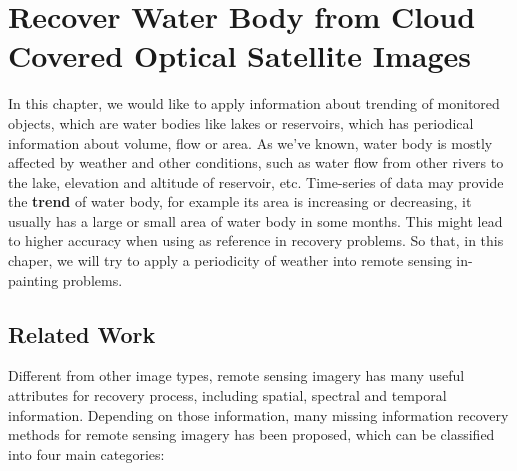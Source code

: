 \chapter{Recover Water Body from Cloud Covered Optical Satellite Images}
\label{chap-3-recover-water-body}
\begin{ChapAbstract}

In this chapter, we would like to apply information about trending of monitored objects, which are water bodies like lakes or reservoirs, which has periodical information about volume, flow or area. As we've known, water body is mostly affected by weather and other conditions, such as water flow from other rivers to the lake, elevation and altitude of reservoir, etc. Time-series of data may provide the \textbf{trend} of water body, for example its area is increasing or decreasing, it usually has a large or small area of water body in some months. This might lead to higher accuracy when using as reference in recovery problems. So that, in this chaper, we will try to apply a periodicity of weather into remote sensing in-painting problems.

\end{ChapAbstract}

\section{Related Work}

Different from other image types, remote sensing imagery has many useful attributes for recovery process, including spatial, spectral and temporal information. Depending on those information, many missing information recovery methods for remote sensing imagery has been proposed, which can be classified into four main categories: 

